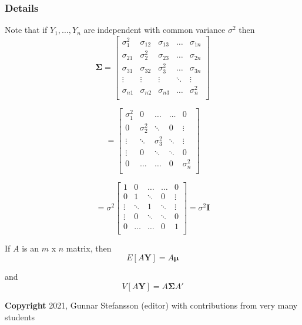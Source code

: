 \documentclass[12pt,a4paper]{article}
\theoremstyle{regla}
\theoremstyle{remark}
\theoremstyle{definition}
\theoremstyle{nonumberbreak}
\begin{document}
\subsubsection{Details}
Note that if $Y_1, \ldots, Y_n$ are independent with common variance $\sigma^2$ then
\[
\boldsymbol{\Sigma}
=
\left[
\begin{array}{ccccc}
\sigma_{1}^{2} & \sigma_{12} & \sigma_{13} & \ldots & \sigma_{1n} \\
\sigma_{21} & \sigma_2^{2} & \sigma_{23} & \ldots & \sigma_{2n} \\
\sigma_{31} &\sigma_{32}  &\sigma_3^{2}  & \ldots & \sigma_{3n}\\
\vdots & \vdots & \vdots & \ddots & \vdots \\
\sigma_{n1} & \sigma_{n2} & \sigma_{n3} & \ldots & \sigma_n^{2}\\ 
\end{array} \right]
\]




\[
 =
\left[
\begin{array}{ccccc}
\sigma_{1}^{2} & 0 & \ldots & \ldots & 0 \\
 0 & \sigma_2^{2} & \ddots & 0  & \vdots \\
 \vdots & \ddots  &\sigma_3^{2}  & \ddots & \vdots \\
\vdots & 0 & \ddots & \ddots & 0 \\
0 & \ldots & \ldots & 0 & \sigma_n^{2}\\ 
\end{array} \right]\]



\[
 = 
\sigma^2
\left[
\begin{array}{ccccc}
1 & 0 & \ldots & \ldots & 0 \\
 0 & 1 & \ddots & 0  & \vdots \\
 \vdots & \ddots  & 1  & \ddots & \vdots \\
\vdots & 0 & \ddots & \ddots & 0 \\
0 & \ldots & \ldots & 0 & 1 \\ 
\end{array} \right]
= \sigma^2 \mathbf{I}
\]



If $A$ is an $m$ x $n$ matrix, then \\

$$ E[A\mathbf{Y}] = A \mathbf{\mu} $$

and
$$ V[A\mathbf{Y}] = A \boldsymbol{\Sigma} A' $$

{\bf Copyright}
2021, Gunnar Stefansson (editor) with contributions from very many students
\end{document}
